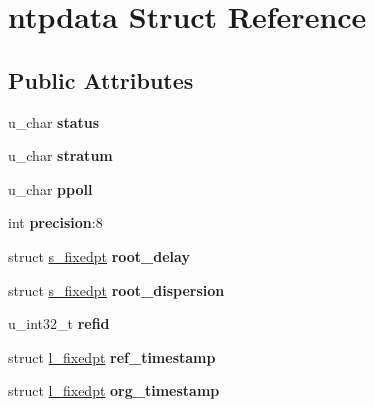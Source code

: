 \hypertarget{structntpdata}{
\section{ntpdata Struct Reference}
\label{structntpdata}
}
\subsection*{Public Attributes}
\begin{DoxyCompactItemize}
\item 
\hypertarget{structntpdata_aa276d0fc4c57eedc27e098046491bc32}{
u\_\-char {\bfseries status}}
\label{structntpdata_aa276d0fc4c57eedc27e098046491bc32}

\item 
\hypertarget{structntpdata_a1a08303a2041e7d04641016e30833cc2}{
u\_\-char {\bfseries stratum}}
\label{structntpdata_a1a08303a2041e7d04641016e30833cc2}

\item 
\hypertarget{structntpdata_abb61971503339d652911f601b7d80792}{
u\_\-char {\bfseries ppoll}}
\label{structntpdata_abb61971503339d652911f601b7d80792}

\item 
\hypertarget{structntpdata_a672699a4fb9c7d7775f5a1af056e5688}{
int {\bfseries precision}:8}
\label{structntpdata_a672699a4fb9c7d7775f5a1af056e5688}

\item 
\hypertarget{structntpdata_acf2e8d5c5fd2dd56e610ab08f392ff5a}{
struct \hyperlink{structs__fixedpt}{s\_\-fixedpt} {\bfseries root\_\-delay}}
\label{structntpdata_acf2e8d5c5fd2dd56e610ab08f392ff5a}

\item 
\hypertarget{structntpdata_a16a78cf3163d20f297292fb123c1f197}{
struct \hyperlink{structs__fixedpt}{s\_\-fixedpt} {\bfseries root\_\-dispersion}}
\label{structntpdata_a16a78cf3163d20f297292fb123c1f197}

\item 
\hypertarget{structntpdata_a73f071629f86cdfe9655be25db7fe434}{
u\_\-int32\_\-t {\bfseries refid}}
\label{structntpdata_a73f071629f86cdfe9655be25db7fe434}

\item 
\hypertarget{structntpdata_a0439ee2653fb8c30c9e07704ed34f9ee}{
struct \hyperlink{structl__fixedpt}{l\_\-fixedpt} {\bfseries ref\_\-timestamp}}
\label{structntpdata_a0439ee2653fb8c30c9e07704ed34f9ee}

\item 
\hypertarget{structntpdata_aa6a38907f877472b0a5d2730a66d78ed}{
struct \hyperlink{structl__fixedpt}{l\_\-fixedpt} {\bfseries org\_\-timestamp}}
\label{structntpdata_aa6a38907f877472b0a5d2730a66d78ed}


\end{DoxyCompactItemize}
